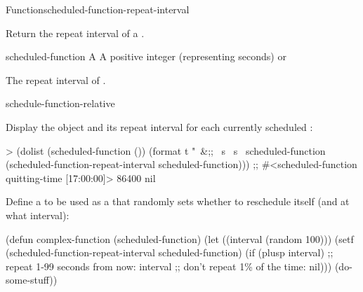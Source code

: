 
\begin{functiondoc}{Function}{scheduled-function-repeat-interval}%
  {}
%
%

\fnsyntax

\fnpurpose Return the repeat interval of a .

\fnsetf
{}%
  {}{}

\fnpackage {}

\fnmodule {}

\fnargs
\begin{args}{scheduled-function}
 A 
 A positive integer (representing seconds) or \nil
\end{args}

\fnreturns The repeat interval of . 

\begin{alsos}{schedule-function-relative}
\end{alsos}

%
\fnexamples 
Display the  object and its repeat interval for each
currently scheduled :
\begin{example}
> (dolist (scheduled-function ())
   (format t "~&;; ~s ~s~%
           scheduled-function
           (scheduled-function-repeat-interval scheduled-function)))
;; #<scheduled-function quitting-time [17:00:00]> 86400
nil
\end{example}

Define a  to be used as a  that randomly
sets whether to reschedule itself (and at what interval):
\begin{example}
  (defun complex-function (scheduled-function)
    (let ((interval (random 100)))
      (setf (scheduled-function-repeat-interval scheduled-function)
            (if (plusp interval) 
                ;; repeat 1-99 seconds from now:
                interval
                ;; don't repeat 1\% of the time:
                nil)))
    (do-some-stuff))
\end{example}

\end{functiondoc}

